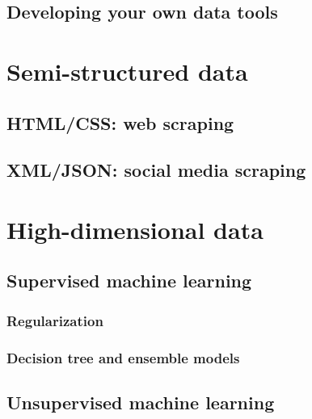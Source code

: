 \documentclass[
]{book}
\begin{document}
\hypertarget{developing-your-own-data-tools}{%
\section{Developing your own data tools}\label{developing-your-own-data-tools}}

\hypertarget{semi_structured_data}{%
\chapter{Semi-structured data}\label{semi_structured_data}}

\hypertarget{htmlcss-web-scraping}{%
\section{HTML/CSS: web scraping}\label{htmlcss-web-scraping}}

\hypertarget{xmljson-social-media-scraping}{%
\section{XML/JSON: social media scraping}\label{xmljson-social-media-scraping}}

\hypertarget{machine_learning}{%
\chapter{High-dimensional data}\label{machine_learning}}

\hypertarget{supervised-machine-learning}{%
\section{Supervised machine learning}\label{supervised-machine-learning}}

\hypertarget{regularization}{%
\subsection{Regularization}\label{regularization}}

\hypertarget{decision-tree-and-ensemble-models}{%
\subsection{Decision tree and ensemble models}\label{decision-tree-and-ensemble-models}}

\hypertarget{unsupervised-machine-learning}{%
\section{Unsupervised machine learning}\label{unsupervised-machine-learning}}
\end{document}
